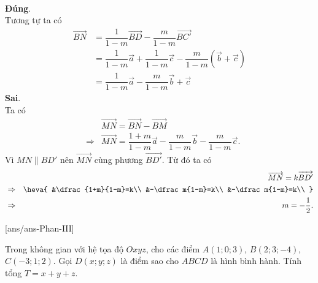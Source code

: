 \begin{ex}
{\begin{itemchoice}
\begin{eqnarray*}
 \end{eqnarray*}
 \itemch \textbf{Đúng}.\\
 Tương tự ta có
 \allowdisplaybreaks
 \begin{align*}
 \overrightarrow{BN}&=\dfrac1{1-m}\overrightarrow{BD}-\dfrac m{1-m}\overrightarrow{BC'}\\
 &=\dfrac1{1-m}\overrightarrow a+\dfrac1{1-m}\overrightarrow c-\dfrac m{1-m}(\overrightarrow b+\overrightarrow c)\\
 &=\dfrac1{1-m}\overrightarrow a-\dfrac m{1-m}\overrightarrow b+\overrightarrow c
 \end{align*}
 \itemch \textbf{Sai}.\\
 Ta có
 \allowdisplaybreaks
 \begin{eqnarray*}
 &&\overrightarrow{MN}=\overrightarrow{BN}-\overrightarrow{BM}\\
 &\Rightarrow&\overrightarrow{MN}=\dfrac{1+m}{1-m}\overrightarrow a-\dfrac m{1-m}\overrightarrow b-\dfrac m{1-m}\overrightarrow c.
 \end{eqnarray*}
 Vì $MN\parallel BD'$ nên $\overrightarrow{MN}$ cùng phương $\overrightarrow{BD'}$. Từ đó ta có
 \allowdisplaybreaks
 \begin{eqnarray*}
 &&\overrightarrow{MN}=k\overrightarrow{BD'}\\
 &\Rightarrow&\heva{
 &\dfrac{1+m}{1-m}=k\\
 &-\dfrac m{1-m}=k\\
 &-\dfrac m{1-m}=k\\
 }\\
 &\Rightarrow&m=-\dfrac12.
 \end{eqnarray*}
 \end{itemchoice}
}\end{ex}

\caukq
{}[ans/ans\currfilebase-Phan-III]
\begin{ex}%
 Trong không gian với hệ tọa độ $Oxyz$, cho các điểm $A(1;0;3)$, $B(2;3;-4)$, $C(-3;1;2)$. Gọi $D(x;y;z)$ là điểm sao cho $ABCD$ là hình bình hành. Tính tổng $T=x+y+z$.
 \end{ex}

